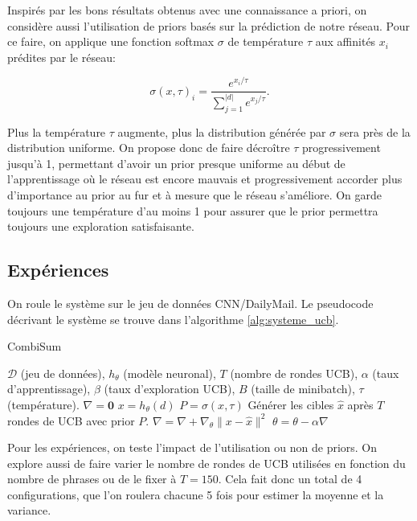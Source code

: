 Inspirés par les bons résultats obtenus avec une connaissance a priori, on considère 
aussi l'utilisation de priors basés sur la prédiction de notre réseau.
Pour ce faire, on applique une fonction softmax $\sigma$ de température $\tau$ aux 
affinités $x_i$ prédites par le réseau:

\begin{equation*}
    \sigma(x, \tau)_i = \dfrac{e^{x_i / \tau}}{\sum_{j=1}^{|d|}e^{x_j / \tau}}.
\end{equation*}

Plus la température $\tau$ augmente, plus la distribution générée par $\sigma$ sera près de la distribution 
uniforme.
On propose donc de faire décroître $\tau$ progressivement jusqu'à 1, permettant d'avoir un prior 
presque uniforme au début de l'apprentissage où le réseau est encore mauvais et progressivement 
accorder plus d'importance au prior au fur et à mesure que le réseau s'améliore.
On garde toujours une température d'au moins 1 pour assurer que le prior permettra toujours 
une exploration satisfaisante.


\subsection{Expériences}

On roule le système sur le jeu de données CNN/DailyMail.
Le pseudocode décrivant le système se trouve dans l'algorithme \ref{alg:systeme_ucb}.

\begin{algorithm}
    \caption{CombiSum}
    \begin{algorithmic}[1]
        \Require  $\mathcal{D}$ (jeu de données), $h_\theta$ (modèle neuronal), $T$ (nombre de rondes UCB), $\alpha$ (taux d'apprentissage), $\beta$ (taux d'exploration UCB), $B$ (taille de minibatch), $\tau$ (température).
         
        \State $\nabla = \mathbf{0}$
        \State $x = h_\theta(d)$
        \State $P = \sigma(x, \tau)$
        \State Générer les cibles $\hat{x}$ après $T$ rondes de UCB avec prior $P$.
        \State $\nabla = \nabla + \nabla_\theta \lVert x - \hat{x} \rVert^2$
        \EndFor
        \State $\theta = \theta - \alpha \nabla$
        \EndWhile
    \end{algorithmic}
    \label{alg:systeme_ucb}
\end{algorithm}

Pour les expériences, on teste l'impact de l'utilisation ou non de priors.
On explore aussi de faire varier le nombre de rondes de UCB utilisées en fonction 
du nombre de phrases ou de le fixer à $T=150$.
Cela fait donc un total de 4 configurations, que l'on roulera chacune 5 fois pour 
estimer la moyenne et la variance.

